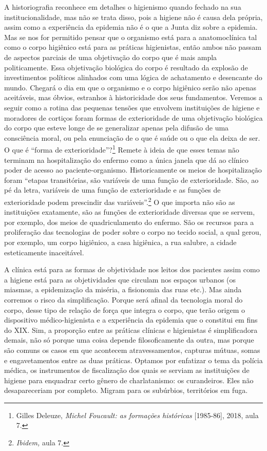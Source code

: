 A historiografia reconhece em detalhes o higienismo quando fechado na
sua institucionalidade, mas não se trata disso, pois a higiene não é
causa dela própria, assim como a experiência da epidemia não é o que a
Junta diz sobre a epidemia. Mas se nos for permitido pensar que o
organismo está para a anatomoclínica tal como o corpo higiênico está
para as práticas higienistas, então ambos não passam de aspectos
parciais de uma objetivação do corpo que é mais ampla politicamente.
Essa objetivação biológica do corpo é resultado da explosão de
investimentos políticos alinhados com uma lógica de achatamento e
desencante do mundo. Chegará o dia em que o organismo e o corpo
higiênico serão não apenas aceitáveis, mas óbvios, estranhos à
historicidade dos seus fundamentos. Veremos a seguir como a rotina das
pequenas tensões que envolvem instituições de higiene e moradores de
cortiços foram formas de exterioridade de uma objetivação biológica do
corpo que esteve longe de se generalizar apenas pela difusão de uma
consciência moral, ou pela enunciação de o que é saúde ou o que ela
deixa de ser. O que é ``forma de exterioridade''?\footnote{Gilles
  Deleuze, \textit{Michel Foucault: as formações históricas}
  {[}1985-86{]}, 2018, aula 7.} Remete à ideia de que esses temas não
terminam na hospitalização do enfermo como a única janela que dá ao
clínico poder de acesso ao paciente-organismo. Historicamente os meios
de hospitalização foram ``etapas transitórias, são variáveis de uma
função de exterioridade. São, ao pé da letra, variáveis de uma função de
exterioridade e as funções de exterioridade podem prescindir das
variáveis''.\footnote{\textit{Ibidem,} aula 7.} O que importa não são as
instituições exatamente, são as funções de exterioridade diversas que se
servem, por exemplo, dos meios de quadriculamento do enfermo. São os
recursos para a proliferação das tecnologias de poder sobre o corpo no
tecido social, a qual gerou, por exemplo, um corpo higiênico, a casa
higiênica, a rua salubre, a cidade esteticamente inaceitável.

A clínica está para as formas de objetividade nos leitos dos pacientes
assim como a higiene está para as objetividades que circulam nos espaços
urbanos (os miasmas, a epidemização da miséria, a fisionomia das ruas
etc.). Mas ainda corremos o risco da simplificação. Porque será afinal
da tecnologia moral do corpo, desse tipo de relação de força que integra
o corpo, que terão origem o dispositivo médico-higienista e a
experiência da epidemia que o constitui em fins do XIX. Sim, a proporção
entre as práticas clínicas e higienistas é simplificadora demais, não só
porque uma coisa depende filosoficamente da outra, mas porque são comuns
os casos em que acontecem atravessamentos, capturas mútuas, somas e
engavetamentos entre as duas práticas. Optamos por enfatizar o tema da
polícia médica, os instrumentos de fiscalização dos quais se serviam as
instituições de higiene para enquadrar certo gênero de charlatanismo: os
curandeiros. Eles não desapareceriam por completo. Migram para os
subúrbios, territórios em fuga.

